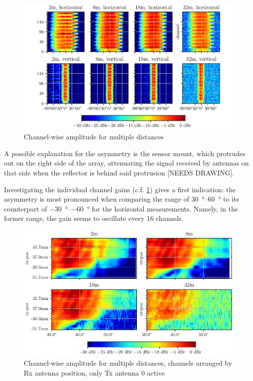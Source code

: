 \begin{figure}
    \centering
    \includegraphics[width=\textwidth]{../figures/channel_amp.pdf}
    \caption{Channel-wise amplitude for multiple distances}
    \label{fig:chan_amp}
\end{figure}

A possible explanation for the asymmetry is the sensor mount,
which protrudes out on the right side of the array,
attenuating the signal received by antennas on that side when the reflector is behind said protrusion [NEEDS DRAWING].

Investigating the individual channel gains (c.f. \ref{fig:chan_amp}) gives a first indication:
the asymmetry is most pronounced when comparing the range of \SIrange{30}{60}{\degree}
to its counterpart of \SIrange{-30}{-60}{\degree} for the horizontal measurements.
Namely, in the former range, the gain seems to oscillate every 16 channels.

\begin{figure}
    \centering
    \includegraphics[width=\textwidth]{../figures/channel_amp_tx0.pdf}
    \caption{Channel-wise amplitude for multiple distances, channels arranged by Rx antenna position, only Tx antenna 0 active}
    \label{fig:chan_amp_tx0}
\end{figure}

